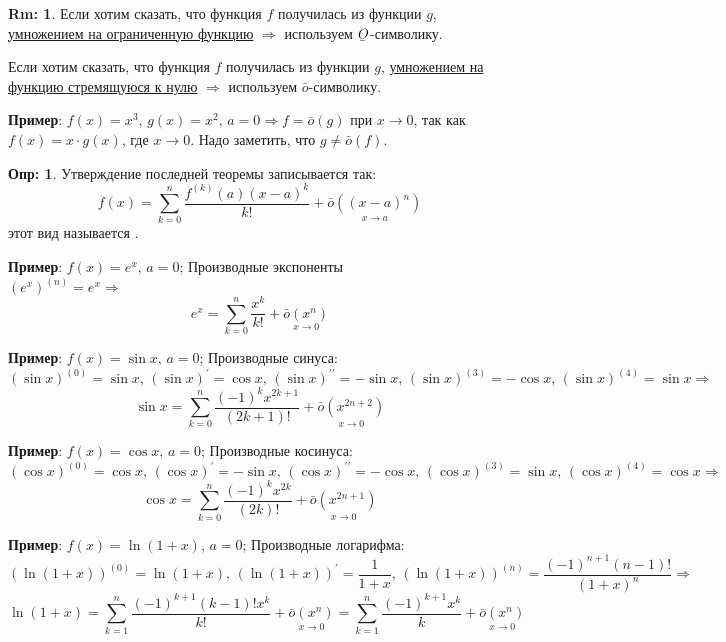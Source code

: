 \documentclass[12pt]{article}
\theoremstyle{definition}
\newtheorem{defn}{Опр:}
\newtheorem{rem}{Rm:}
\newcommand{\ubar}[1]{\underaccent{\bar}{#1}}
\begin{document}
\begin{rem}
	Если хотим сказать, что функция $f$ получилась из функции $g$, \uline{умножением на ограниченную функцию} $\Rightarrow$ используем $\ubar{O}$-символику.
	
	Если хотим сказать, что функция $f$ получилась из функции $g$, \uline{умножением на функцию стремящуюся к нулю} $\Rightarrow$ используем $\bar{o}$-символику.
\end{rem}

\textbf{Пример}: $f(x) = x^3, \, g(x) = x^2, \, a = 0 \Rightarrow f = \bar{o}(g)$ при $x \to 0$, так как $f(x) = x{\cdot}g(x)$, где $x \to 0$. Надо заметить, что $g \neq\bar{o}(f)$.

\begin{defn}
	Утверждение последней теоремы записывается так:
	$$f(x) = \sum\limits_{k = 0}^{n}\dfrac{f^{(k)}(a)(x-a)^k}{k!} + \underset{x \to a}{\bar{o}((x-a)^n)}$$
	этот вид называется .
\end{defn}

\textbf{Пример}: $f(x) = e^x, \, a= 0$; Производные экспоненты\\
$(e^x)^{(n)} = e^x \Rightarrow$ 
$$e^x = \sum\limits_{k = 0}^{n}\dfrac{x^k}{k!} + \underset{x \to 0}{\bar{o}(x^n)}$$

\textbf{Пример}: $f(x) = \sin{x}, \, a= 0$; Производные синуса: \\
$(\sin{x})^{(0)} = \sin{x}, \, (\sin{x})^\prime = \cos{x}, \, (\sin{x})^{\prime\prime} = -\sin{x}, \, (\sin{x})^{(3)} = -\cos{x}, \, (\sin{x})^{(4)} = \sin{x} \Rightarrow $ \\
$$\sin{x} = \sum\limits_{k = 0}^{n}\dfrac{(-1)^{k}x^{2k+1}}{(2k+1)!} + \underset{x \to 0}{\bar{o}(x^{2n+2})}$$

\textbf{Пример}: $f(x) = \cos{x}, \, a= 0$; Производные косинуса: \\
$(\cos{x})^{(0)} = \cos{x}, \, (\cos{x})^\prime = -\sin{x}, \, (\cos{x})^{\prime\prime} = -\cos{x}, \, (\cos{x})^{(3)} = \sin{x}, \, (\cos{x})^{(4)} = \cos{x}\Rightarrow$\\  
$$\cos{x} = \sum\limits_{k = 0}^{n}\dfrac{(-1)^{k}x^{2k}}{(2k)!} + \underset{x \to 0}{\bar{o}(x^{2n+1})}$$

\textbf{Пример}: $f(x) = \ln{(1 + x)}, \, a= 0$; Производные логарифма: \\
$(\ln{(1+x)})^{(0)} = \ln{(1+x)}, \, (\ln{(1+x)})^\prime = \dfrac{1}{1+x}, \, (\ln{(1+x)})^{(n)} = \dfrac{(-1)^{n+1}(n-1)!}{(1+x)^n} \Rightarrow$ 
$$\ln{(1+x)} = \sum\limits_{k = 1}^{n}\dfrac{(-1)^{k+1}(k-1)! x^k}{k!} + \underset{x \to 0}{\bar{o}(x^n)} = \sum\limits_{k = 1}^{n}\dfrac{(-1)^{k+1} x^k}{k} + \underset{x \to 0}{\bar{o}(x^n)}$$
\end{document}
